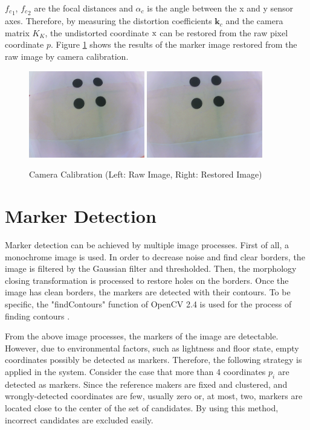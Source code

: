 \({f_c}_1\), \({f_c}_2\) are the focal distances and \(\alpha_c\) is the angle between the x and y sensor axes. Therefore, by measuring the distortion coefficients  \( \boldsymbol{k}_c\) and the camera matrix \(K_K\), the undistorted coordinate \( \boldsymbol{\text x} \) can be restored from the raw pixel coordinate \(p\). Figure \ref{fig:camera_calibration} shows the results of the marker image restored from the raw image by camera calibration.
\begin{figure}
    \centering
    \includegraphics[width=0.45\textwidth]{graphics/raw.png}
    \includegraphics[width=0.45\textwidth]{graphics/undistorted.png}
    \caption{Camera Calibration (Left: Raw Image, Right: Restored Image)}
    \label{fig:camera_calibration}
\end{figure}

\section{Marker Detection}
Marker detection can be achieved by multiple image processes. First of all, a monochrome image is used. In order to decrease noise and find clear borders, the image is filtered by the Gaussian filter and thresholded. Then, the morphology closing transformation is processed to restore holes on the borders. Once the image has clean borders, the markers are detected with their contours. To be specific, the "findContours" function of OpenCV 2.4 is used for the process of finding contours \cite{opencv}.

From the above image processes, the markers of the image are detectable. However, due to environmental factors, such as lightness and floor state, empty coordinates possibly be detected as markers. Therefore, the following strategy is applied in the system. Consider the case that more than 4 coordinates \(p_i\) are detected as markers. Since the reference makers are fixed and clustered, and wrongly-detected coordinates are few, usually zero or, at most, two, markers are located close to the center of the set of candidates. By using this method, incorrect candidates are excluded easily.

